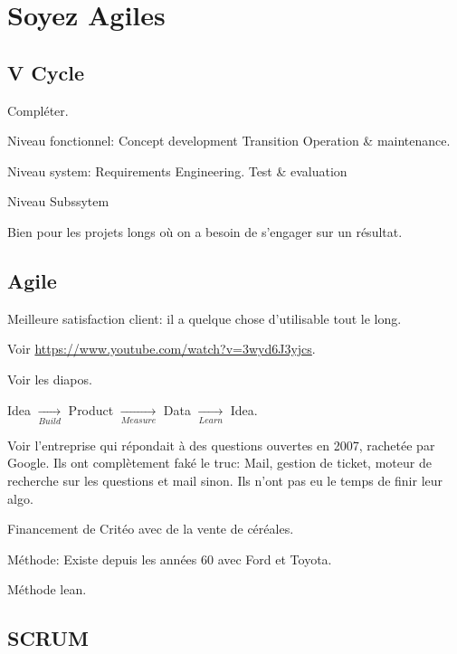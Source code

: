 \documentclass[a4paper,11pt]{article}
\begin{document}
\section{Soyez Agiles}

\subsection{V Cycle}

Compléter.

Niveau fonctionnel: Concept development \quad Transition Operation & maintenance.

Niveau system: Requirements Engineering. \quad Test & evaluation

Niveau Subssytem

Bien pour les projets longs où on a besoin de s'engager sur un résultat.

\subsection{Agile}

Meilleure satisfaction client: il a quelque chose d'utilisable tout le long.

Voir \url{https://www.youtube.com/watch?v=3wyd6J3yjcs}.

Voir les diapos.

Idea $\underset{Build}{\longrightarrow}$ Product $\underset{Measure}
{\longrightarrow}$ Data $\underset{Learn}{\longrightarrow}$ Idea.

Voir l'entreprise qui répondait à des questions ouvertes en 2007, rachetée par
Google. Ils ont complètement faké le truc: Mail, gestion de ticket, moteur de
recherche sur les questions et mail sinon. Ils n'ont pas eu le temps de finir
leur algo.

Financement de Critéo avec de la vente de céréales.

Méthode: Existe depuis les années 60 avec Ford et Toyota.

Méthode lean.

\subsection{SCRUM}
\end{document}
